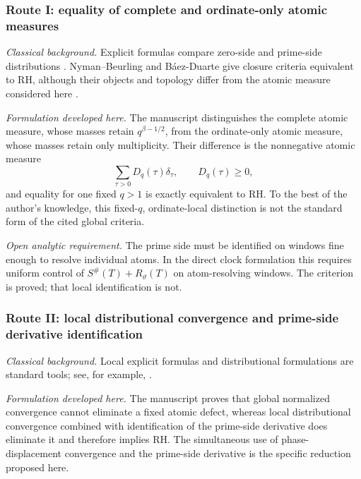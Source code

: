 \documentclass[11pt]{amsart}
\numberwithin{equation}{section}
\theoremstyle{plain}
\theoremstyle{definition}
\theoremstyle{remark}
\newcommand{\1}{\mathbf{1}}
\begin{document}
\subsubsection*{Route I: equality of complete and ordinate-only atomic measures}

\emph{Classical background.}
Explicit formulas compare zero-side and prime-side distributions
\cite{Weil1952}. Nyman--Beurling and Báez-Duarte give closure criteria
equivalent to RH, although their objects and topology differ from the atomic
measure considered here \cite{Nyman1950,Beurling1955,BaezDuarte2003}.

\emph{Formulation developed here.}
The manuscript distinguishes the complete atomic measure, whose masses retain
$q^{\beta-1/2}$, from the ordinate-only atomic measure, whose masses retain
only multiplicity. Their difference is the nonnegative atomic measure
\begin{equation}
\sum_{\tau>0}D_q(\tau)\delta_\tau,
\qquad D_q(\tau)\geq0,
\label{eq:conclusion_route1_defect}
\end{equation}
and equality for one fixed $q>1$ is exactly equivalent to RH. To the best of
the author's knowledge, this fixed-$q$, ordinate-local distinction is not the
standard form of the cited global criteria.

\emph{Open analytic requirement.}
The prime side must be identified on windows fine enough to resolve individual
atoms. In the direct clock formulation this requires uniform control of
$S^{\#}(T)+R_\vartheta(T)$ on atom-resolving windows. The criterion is proved;
that local identification is not.

\subsubsection*{Route II: local distributional convergence and prime-side derivative identification}

\emph{Classical background.}
Local explicit formulas and distributional formulations are standard tools;
see, for example, \cite{IwaniecKowalski2004,Titchmarsh1986}.

\emph{Formulation developed here.}
The manuscript proves that global normalized convergence cannot eliminate a
fixed atomic defect, whereas local distributional convergence combined with
identification of the prime-side derivative does eliminate it and therefore
implies RH. The simultaneous use of phase-displacement convergence and the
prime-side derivative is the specific reduction proposed here.
\end{document}
